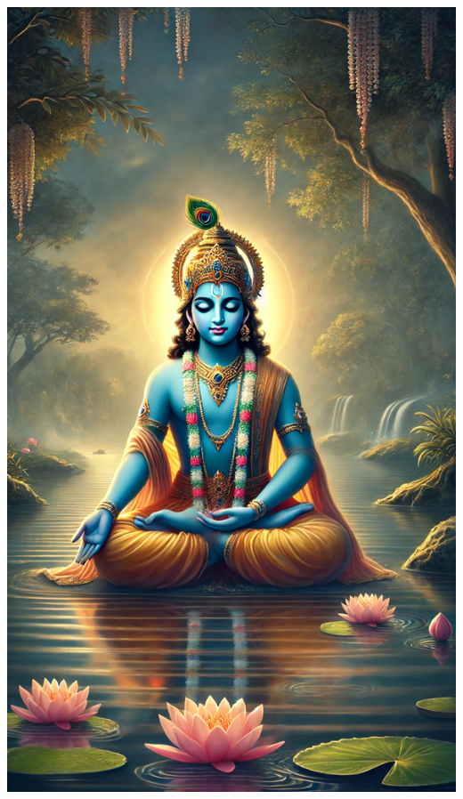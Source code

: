 \clearpage
{} %
\thispagestyle{empty}
\begin{center}
\includegraphics[width=\paperwidth, height=\paperheight, keepaspectratio]{./images/krishna1.png}
\end{center}
\restoregeometry %
\newpage

